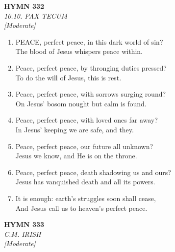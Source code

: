 \newpage
\begin{center}
    {\Large \textbf{HYMN 332}}
    \\
    \textit{10.10. PAX TECUM}
    \\
    \textit{\small [Moderate]}
\end{center}
\vspace{1em}

\begin{enumerate}
    \item PEACE, perfect peace, in this dark world of sin? \\
        The blood of Jesus whispers peace within.

    \item Peace, perfect peace, by thronging duties pressed? \\
        To do the will of Jesus, this is rest.

    \item Peace, perfect peace, with sorrows surging round? \\
        On Jesus' bosom nought but calm is found.

    \item Peace, perfect peace, with loved ones far away? \\
        In Jesus' keeping we are safe, and they.

    \item Peace, perfect peace, our future all unknown? \\
        Jesus we know, and He is on the throne.

    \item Peace, perfect peace, death shadowing us and ours? \\
        Jesus has vanquished death and all its powers.

    \item It is enough: earth's struggles soon shall cease, \\
        And Jesus call us to heaven's perfect peace.

\end{enumerate}

\newpage
\begin{center}
    {\Large \textbf{HYMN 333}}
    \\
    \textit{C.M. IRISH}
    \\
    \textit{\small [Moderate]}
\end{center}
\vspace{1em}

